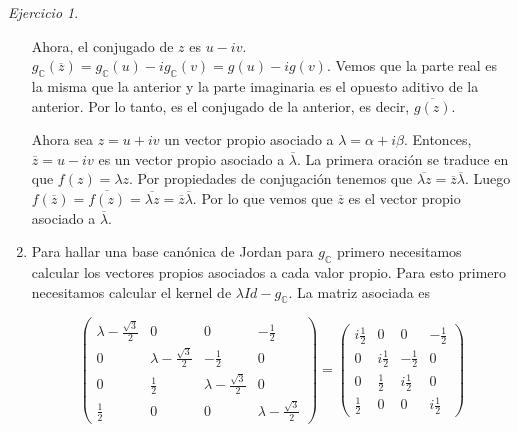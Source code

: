 \documentclass[11pt,a4paper]{article}
\theoremstyle{definition}
\theoremstyle{remark}
\newtheorem{exc}{Ejercicio}
\begin{document}
\begin{exc}
\begin{enumerate}
	 		Ahora, el conjugado de $ z $ es $ u-iv $. $ g_\mathbb{C}(\overline{z})=g_\mathbb{C}(u)-ig_\mathbb{C}(v)=g(u)-ig(v) $. Vemos que la parte real es la misma que la anterior y la parte imaginaria es el opuesto aditivo de la anterior. Por lo tanto, es el conjugado de la anterior, es decir, $ \overline{g(z)} $.
	 		
	 		Ahora sea $ z=u+iv $ un vector propio asociado a $ \lambda=\alpha+i\beta $. Entonces, $ \overline{z}=u-iv $ es un vector propio asociado a $  \overline{\lambda} $.
	 		La primera oración se traduce en que $ f(z)=\lambda z $. Por propiedades de conjugación tenemos que $ \overline{\lambda z}=\overline{z}\overline{\lambda} $. Luego $ f(\overline{z})=\overline{f(z)}= \overline{\lambda z}=\overline{z}\overline{\lambda} $. Por lo que vemos que $ \overline{z} $ es el vector propio asociado a $ \overline{\lambda} $. 
			
			\item Para hallar una base canónica de Jordan para $ g_\mathbb{C} $ primero necesitamos calcular los vectores propios asociados a cada valor propio. Para esto primero necesitamos calcular el kernel de $ \lambda Id-g_\mathbb{C}$. La matriz asociada es
			
			\begin{equation}
			\begin{pmatrix}
			\lambda-\frac{\sqrt{3}}{2} & 0 & 0 & -\frac{1}{2}				\\ 0 & \lambda-\frac{\sqrt{3}}{2} & -\frac{1}{2} & 0 
								\\ 0 & \frac{1}{2} & \lambda-\frac{\sqrt{3}}{2} & 0
								\\ \frac{1}{2} & 0 & 0 & \lambda-\frac{\sqrt{3}}{2}
						\end{pmatrix} =
						\begin{pmatrix}
						i\frac{1}{2} & 0 & 0 & -\frac{1}{2}
								\\ 0 & i\frac{1}{2} & -\frac{1}{2} & 0 
								\\ 0 & \frac{1}{2} & i\frac{1}{2} & 0
								\\ \frac{1}{2} & 0 & 0 & i\frac{1}{2}
						\end{pmatrix}\nonumber
						\end{equation}
						

\end{enumerate}
\end{exc}
\end{document}
